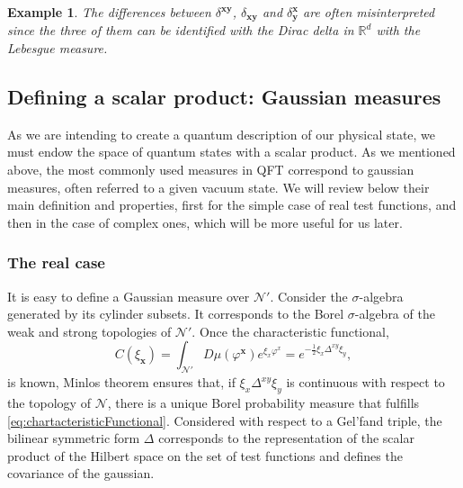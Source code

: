 \documentclass[12pt]{article}%
\newtheorem{example}{Example}%
\begin{document}
\begin{example}
The differences between $\delta^{\mathbf{xy}}$, $\delta_{\mathbf{xy}}$ and $\delta^{\mathbf{x}}_{\mathbf{y}}$ are often misinterpreted since the three of them can be identified with the Dirac delta in $\mathbb{R}^d$ with the Lebesgue measure. 
\end{example}

\subsection{Defining a scalar product: Gaussian measures}
As we are intending to create a quantum description of our physical state, we must endow the space of quantum states with a scalar product.  As we mentioned above, the most commonly used measures in QFT correspond to gaussian measures, often referred to a given vacuum state. 
We will review below their main definition and  properties, first for the simple case of real test functions, and then in the case of complex ones, which will be more useful for us later.
\subsubsection{The real case}
It is easy to define a Gaussian measure over $\mathcal{N}'$. Consider the $\sigma$-algebra generated by its cylinder subsets. It corresponds to the Borel $\sigma$-algebra of the weak and strong topologies of $\mathcal{N}'$.  Once the characteristic functional,
\begin{equation}
    \label{eq:chartacteristicFunctional}
        C(\xi_{\mathbf{x}})=\int_{\mathcal{N}'}D\mu(\varphi^{\mathbf{x}}) e^{\xi_x\varphi^x} =e^{-\frac{1}{2}{\xi}_x\Delta^{xy}\xi_y},
\end{equation}
is known, Minlos theorem \cite{Gellfand,Hida1993} ensures that, if ${\xi}_x\Delta^{xy}\xi_y$ is continuous with respect to the topology of $\mathcal{N}$, there is a unique Borel probability measure that fulfills \eqref{eq:chartacteristicFunctional}. Considered with respect to a Gel'fand triple, the bilinear symmetric form $\Delta$ corresponds to the representation of the scalar product of the Hilbert space on the set of test functions and defines the covariance of the gaussian.
\end{document}
